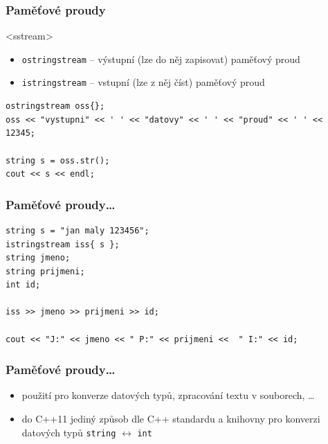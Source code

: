 \begin{frame}[fragile]
\frametitle{Paměťové proudy}

\begin{block}{<sstream>}
\begin{itemize}
\item \lstinline|ostringstream| -- výstupní (lze do něj zapisovat) paměťový proud
\item \lstinline|istringstream| -- vstupní (lze z něj číst) paměťový proud
\end{itemize}
\end{block}

\begin{yesblock}
\begin{lstlisting}
ostringstream oss{};
oss << "vystupni" << ' ' << "datovy" << ' ' << "proud" << ' ' << 12345;

string s = oss.str();
cout << s << endl;
\end{lstlisting}
\end{yesblock}
\end{frame}

\begin{frame}[fragile]
\frametitle{Paměťové proudy\ldots}

\begin{yesblock}
\begin{lstlisting}
string s = "jan maly 123456";
istringstream iss{ s };
string jmeno;
string prijmeni;
int id;

iss >> jmeno >> prijmeni >> id;

cout << "J:" << jmeno << " P:" << prijmeni <<  " I:" << id;
\end{lstlisting}
\end{yesblock}
\end{frame}



\begin{frame}[fragile]
\frametitle{Paměťové proudy\ldots}

\begin{block}{}
\begin{itemize}
\item použití pro konverze datových typů, zpracování textu v souborech, \ldots
\item do C++11 jediný způsob dle C++ standardu a knihovny pro konverzi datových typů \lstinline|string| $\leftrightarrow$ \lstinline|int|
\end{itemize}
\end{block}
\end{frame}

